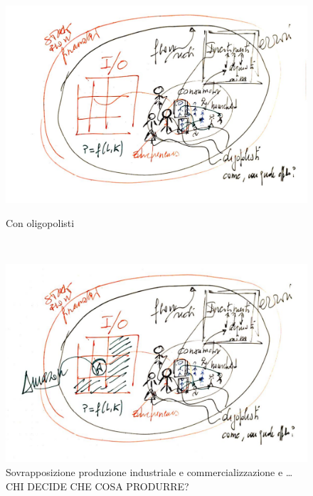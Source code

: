 \documentclass[]{beamer}
\begin{document}
\begin{frame}{~}



\begin{figure}[H]
\center
\includegraphics[scale=0.50]{5.pdf}
\label{5}
\caption{Con oligopolisti}
\end{figure}

\end{frame}

\begin{frame}{~} %



\begin{figure}[H]
\center
\includegraphics[scale=0.50]{6.pdf}
\caption{Sovrapposizione produzione industriale e commercializzazione e \ldots CHI DECIDE CHE COSA PRODURRE?}
\label{6}
\end{figure}

\end{frame}
\end{document}
